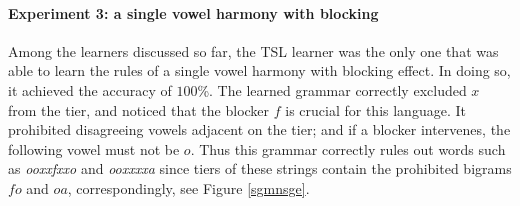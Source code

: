 \paragraph{Experiment 3: a single vowel harmony with blocking}

Among the learners discussed so far, the TSL learner was the only one that was able to learn the rules of a single vowel harmony with blocking effect.
In doing so, it achieved the accuracy of $100$\%.
The learned grammar correctly excluded $x$ from the tier, and noticed that the blocker $f$ is crucial for this language.
It prohibited disagreeing vowels adjacent on the tier; and if a blocker intervenes, the following vowel must not be $o$.
Thus this grammar correctly rules out words such as \emph{ooxxfxxo} and \emph{ooxxxxa} since tiers of these strings contain the prohibited bigrams $fo$ and $oa$, correspondingly, see Figure \ref{sgmnsge}.

\begin{table}[h!]
\centering
{}
\caption{TSL learning of a single harmony with blockers; abstract representation.}
\end{table}

